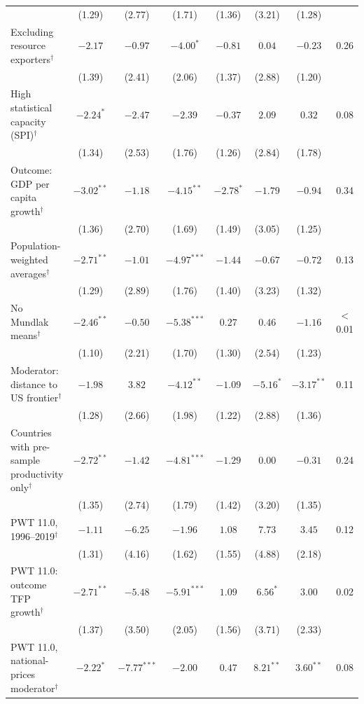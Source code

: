 \documentclass[pdflatex,sn-basic]{sn-jnl}%
\theoremstyle{thmstyleone}
\theoremstyle{thmstyletwo}
\renewenvironment{table}[1][]{\begin{tableorg}[#1]\centering\tablebodyfont}{\end{tableorg}}
\begin{document}
\begin{appendices}
\begin{table}[!p]
{\begin{threeparttable}
\begin{tabular}{lccccccc}
 & (1.29) & (2.77) & (1.71) & (1.36) & (3.21) & (1.28) & \\
\quad Excluding resource exporters$^{\dagger}$ & $-2.17$ & $-0.97$ & $-4.00^{*}$ & $-0.81$ & $0.04$ & $-0.23$ & 0.26\\
 & (1.39) & (2.41) & (2.06) & (1.37) & (2.88) & (1.20) & \\
\quad High statistical capacity (SPI)$^{\dagger}$ & $-2.24^{*}$ & $-2.47$ & $-2.39$ & $-0.37$ & $2.09$ & $0.32$ & 0.08\\
 & (1.34) & (2.53) & (1.76) & (1.26) & (2.84) & (1.78) & \\
\quad Outcome: GDP per capita growth$^{\dagger}$ & $-3.02^{**}$ & $-1.18$ & $-4.15^{**}$ & $-2.78^{*}$ & $-1.79$ & $-0.94$ & 0.34\\
 & (1.36) & (2.70) & (1.69) & (1.49) & (3.05) & (1.25) & \\
\quad Population-weighted averages$^{\dagger}$ & $-2.71^{**}$ & $-1.01$ & $-4.97^{***}$ & $-1.44$ & $-0.67$ & $-0.72$ & 0.13\\
 & (1.29) & (2.89) & (1.76) & (1.40) & (3.23) & (1.32) & \\
\quad No Mundlak means$^{\dagger}$ & $-2.46^{**}$ & $-0.50$ & $-5.38^{***}$ & $0.27$ & $0.46$ & $-1.16$ & $<$0.01\\
 & (1.10) & (2.21) & (1.70) & (1.30) & (2.54) & (1.23) & \\
\quad Moderator: distance to US frontier$^{\dagger}$ & $-1.98$ & $3.82$ & $-4.12^{**}$ & $-1.09$ & $-5.16^{*}$ & $-3.17^{**}$ & 0.11\\
 & (1.28) & (2.66) & (1.98) & (1.22) & (2.88) & (1.36) & \\
\quad Countries with pre-sample productivity only$^{\dagger}$ & $-2.72^{**}$ & $-1.42$ & $-4.81^{***}$ & $-1.29$ & $0.00$ & $-0.31$ & 0.24\\
 & (1.35) & (2.74) & (1.79) & (1.42) & (3.20) & (1.35) & \\
\quad PWT 11.0, 1996--2019$^{\dagger}$ & $-1.11$ & $-6.25$ & $-1.96$ & $1.08$ & $7.73$ & $3.45$ & 0.12\\
 & (1.31) & (4.16) & (1.62) & (1.55) & (4.88) & (2.18) & \\
\quad PWT 11.0: outcome TFP growth$^{\dagger}$ & $-2.71^{**}$ & $-5.48$ & $-5.91^{***}$ & $1.09$ & $6.56^{*}$ & $3.00$ & 0.02\\
 & (1.37) & (3.50) & (2.05) & (1.56) & (3.71) & (2.33) & \\
\quad PWT 11.0, national-prices moderator$^{\dagger}$ & $-2.22^{*}$ & $-7.77^{***}$ & $-2.00$ & $0.47$ & $8.21^{**}$ & $3.60^{**}$ & 0.08\\

\end{tabular}
\end{threeparttable}}
\end{table}
\end{appendices}
\end{document}
